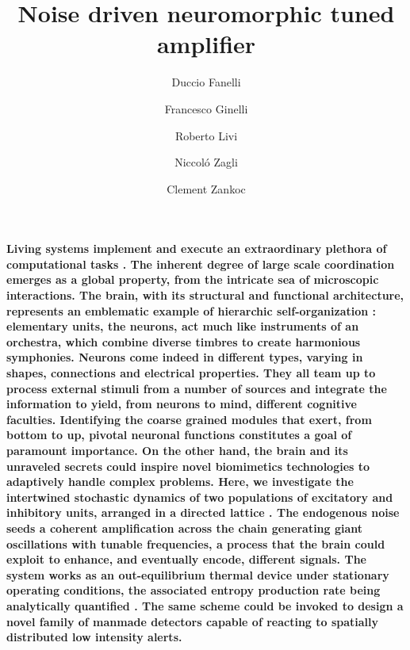 \documentclass[showpacs,prl,superscriptaddress,nofootinbib, twocolumn]{revtex4}
\begin{document}
\title{Noise driven neuromorphic tuned amplifier}

\author{Duccio Fanelli}  
\author{Francesco Ginelli} 
\author{Roberto Livi} 
\author{Niccol\'o Zagli} 
\author{Clement Zankoc} 

\maketitle


{\bf  Living systems implement and execute an extraordinary plethora of computational tasks \cite{alberts, sole2}. The inherent degree of large scale coordination emerges as a global property, from the intricate sea of microscopic interactions. The brain, with its structural and functional architecture, represents an emblematic example of hierarchic self-organization \cite{kandel}:  elementary units, the neurons,  act much like instruments of an orchestra, which combine diverse timbres to create harmonious symphonies. Neurons come indeed in different types, varying in shapes, connections and electrical properties. They all team up to process external stimuli from a number of sources and integrate the information to yield, from neurons to mind, different cognitive faculties. Identifying the coarse grained modules that exert, from bottom to up, pivotal neuronal functions constitutes a goal of paramount importance.
On the other hand, the brain and its unraveled secrets could inspire novel biomimetics technologies to adaptively handle complex problems. Here, we investigate the intertwined stochastic dynamics of two populations of excitatory and inhibitory units, arranged in a directed lattice \cite{bressloff, ButlerPNAS}. The endogenous noise \cite{vankampen,mckanenewman, dauxois} seeds a coherent amplification across the chain generating giant oscillations with tunable frequencies, a process that the brain could exploit to enhance, and eventually encode, different signals. The system works as an out-equilibrium thermal device under stationary operating conditions, the associated entropy production rate being analytically quantified \cite{Schnakenberg,thermo, thermo1}. The same scheme could be invoked to design a novel family of manmade detectors capable of reacting to spatially distributed low intensity alerts.}
\end{document}

